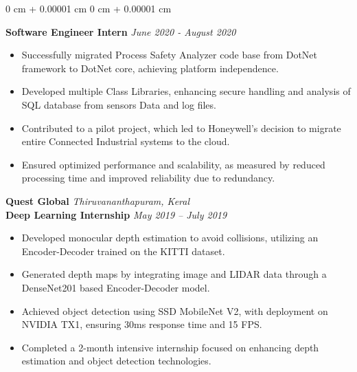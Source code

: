 \documentclass[10pt, letterpaper]{article}
\newenvironment{highlights}{
    \begin{itemize}[
        topsep=0.03 cm,
        parsep=0.02 cm,
        partopsep=0pt,
        itemsep=0pt,
        leftmargin=0 cm + 5pt
    ]
}{
    \end{itemize}
} %
\newenvironment{onecolentry}{
    \begin{adjustwidth}{
        0 cm + 0.00001 cm
    }{
        0 cm + 0.00001 cm
    }
}{
    \end{adjustwidth}
} %
\begin{document}
\begin{onecolentry}
            \vspace{0.2 cm}
            \textbf{\normalsize Software Engineer Intern} \hfill \textit{\textcolor{darkteal}{June 2020 -  August 2020}} \\ %
            \begin{adjustwidth}{0.4cm}{0cm}
                \begin{highlights}
                    \item Successfully migrated Process Safety Analyzer code base from DotNet framework to DotNet core, achieving platform independence.
                    \item Developed multiple Class Libraries, enhancing secure handling and analysis of SQL database from sensors Data and log files.
                    \item Contributed to a pilot project, which led to Honeywell's decision to migrate entire Connected Industrial systems to the cloud.
                    \item Ensured optimized performance and scalability, as measured by reduced processing time and improved reliability due to redundancy.
                \end{highlights}
            \end{adjustwidth}

            \vspace{0.2 cm}
            \textbf{\large  Quest Global} \hfill \textit{\textcolor{darkteal}{Thiruvananthapuram, Keral}} \\  
            \textbf{Deep Learning Internship} \hfill \textit{\textcolor{darkteal}{May 2019 – July 2019}}  \\  
            \begin{adjustwidth}{0.4cm}{0cm}
                \begin{highlights}
                    \item Developed monocular depth estimation to avoid collisions, utilizing an Encoder-Decoder trained on the KITTI dataset.
                    \item Generated depth maps by integrating image and LIDAR data through a DenseNet201 based Encoder-Decoder model.
                    \item Achieved object detection using SSD MobileNet V2, with deployment on NVIDIA TX1, ensuring 30ms response time and 15 FPS.
                    \item Completed a 2-month intensive internship focused on enhancing depth estimation and object detection technologies.
                \end{highlights}
            \end{adjustwidth}


\end{onecolentry}
\end{document}
